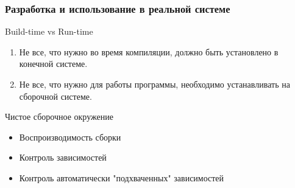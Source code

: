 \begin{frame}
	\frametitle{Разработка и использование в реальной системе}
	
	\begin{block}{Build-time vs Run-time}

		\begin{enumerate}
			\item Не все, что нужно во время компиляции, должно быть установлено в конечной системе.
			\item Не все, что нужно для работы программы, необходимо устанавливать на сборочной системе.
		\end{enumerate}
	\end{block}

	\begin{block}{Чистое сборочное окружение}
		\begin{itemize}
			\item Воспроизводимость сборки 
			\item Контроль зависимостей
			\item Контроль автоматически "подхваченных" зависимостей
		\end{itemize}
	\end{block}
\end{frame}

